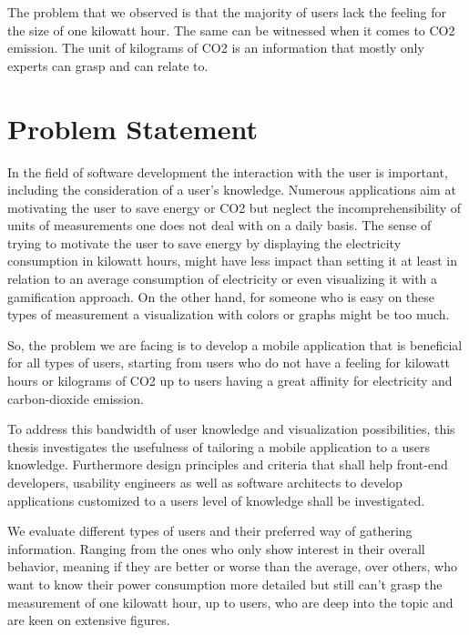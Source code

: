  The problem that we observed is that the majority of users lack the feeling for the size of one kilowatt hour. The same can be witnessed when it comes to CO2 emission. The unit of kilograms of CO2 is an information that mostly only experts can grasp and can relate to.

\section{Problem Statement}

In the field of software development the interaction with the user is important, including the consideration of a user's knowledge. Numerous applications aim at motivating the user to save energy or CO2 but neglect the incomprehensibility of units of measurements one does not deal with on a daily basis. The sense of trying to motivate the user to save energy by displaying the electricity consumption in kilowatt hours, might have less impact than setting it at least in relation to an average consumption of electricity or even visualizing it with a gamification approach. On the other hand, for someone who is easy on these types of measurement a visualization with colors or graphs might be too much.

So, the problem we are facing is to develop a mobile application that is beneficial for all types of users, starting from users who do not have a feeling for kilowatt hours or kilograms of CO2 up to users having a great affinity for electricity and carbon-dioxide emission.

To address this bandwidth of user knowledge and visualization possibilities, this thesis investigates the usefulness of tailoring a mobile application to a users knowledge. Furthermore design principles and criteria that shall help front-end developers, usability engineers as well as software architects to develop applications customized to a users level of knowledge shall be investigated.

We evaluate different types of users and their preferred way of gathering information. Ranging from the ones who  only show interest in their overall behavior, meaning if they are better or worse than the average, over others, who want to know their power consumption more detailed but still can't grasp the measurement of one kilowatt hour, up to users, who are deep into the topic and are keen on extensive figures.

